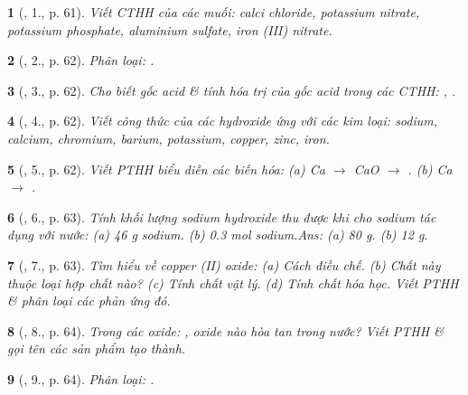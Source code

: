 \documentclass{article}
\newtheorem{baitoan}{}
\begin{document}
\begin{baitoan}[\cite{An_Hoa_Hoc_nang_cao_8_9}, 1., p. 61]
	Viết {\rm CTHH} của các muối: calci chloride, potassium nitrate, potassium phosphate, aluminium sulfate, iron (III) nitrate.
\end{baitoan}

\begin{baitoan}[\cite{An_Hoa_Hoc_nang_cao_8_9}, 2., p. 62]
	Phân loại: {\rm{}}.
\end{baitoan}

\begin{baitoan}[\cite{An_Hoa_Hoc_nang_cao_8_9}, 3., p. 62]
	Cho biết gốc acid \& tính hóa trị của gốc acid trong các {\rm CTHH}: {\rm{}, }.
\end{baitoan}

\begin{baitoan}[\cite{An_Hoa_Hoc_nang_cao_8_9}, 4., p. 62]
	Viết công thức của các hydroxide ứng với các kim loại: sodium, calcium, chromium, barium, potassium, copper, zinc, iron.
\end{baitoan}

\begin{baitoan}[\cite{An_Hoa_Hoc_nang_cao_8_9}, 5., p. 62]
	Viết {\rm PTHH} biểu diễn các biến hóa: (a) {\rm Ca $\to$ CaO $\to$ }. (b) {\rm Ca $\to$ }.
\end{baitoan}

\begin{baitoan}[\cite{An_Hoa_Hoc_nang_cao_8_9}, 6., p. 63]
	Tính khối lượng sodium hydroxide thu được khi cho sodium tác dụng với nước: (a) {\rm46 g} sodium. (b) {0.3 mol} sodium.\hfill{\sf Ans: (a) 80 g. (b) 12 g.}
\end{baitoan}

\begin{baitoan}[\cite{An_Hoa_Hoc_nang_cao_8_9}, 7., p. 63]
	Tìm hiểu về copper (II) oxide: (a) Cách điều chế. (b) Chất này thuộc loại hợp chất nào? (c) Tính chất vật lý. (d) Tính chất hóa học. Viết {\rm PTHH} \& phân loại các phản ứng đó.
\end{baitoan}

\begin{baitoan}[\cite{An_Hoa_Hoc_nang_cao_8_9}, 8., p. 64]
	Trong các oxide: {\rm{}}, oxide nào hòa tan trong nước? Viết {\rm PTHH} \& gọi tên các sản phẩm tạo thành.
\end{baitoan}

\begin{baitoan}[\cite{An_Hoa_Hoc_nang_cao_8_9}, 9., p. 64]
	Phân loại: {\rm{}}.
\end{baitoan}
\end{document}
